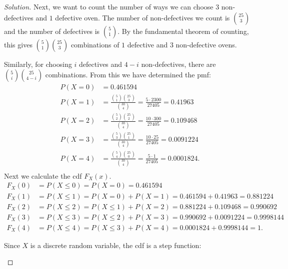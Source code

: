 \documentclass[12pt]{article}
\theoremstyle{definition}
\theoremstyle{plain}
\newenvironment{solution}
  {\begin{proof}[Solution]}
  {\end{proof}}
\begin{document}
\begin{enumerate}
\begin{solution}
Next, we want to count the number of ways we can choose $ 3 $ non-defectives and $ 1 $ defective oven. The number of non-defectives we count is $ \binom{25}{3} $ and the number of defectives is $ \binom{5}{1} $. By the fundamental theorem of counting, this gives $ \binom{5}{1}  \binom{25}{3}$ combinations of $ 1$ defective and $ 3 $ non-defective ovens.

Similarly, for choosing $ i $ defectives and $ 4 - i $ non-defectives, there are $ \binom{5}{i} \binom{25}{4 - i} $ combinations. From this we have determined the pmf:
\begin{align*}
	P(X = 0) &= 0.461594 \\
	P(X = 1) &= \frac{\binom{5}{1} \binom{25}{3}}{ \binom{30}{4}} = \frac{5 \cdot 2300}{27405} = 0.41963\\
	P(X = 2) &= \frac{\binom{5}{2} \binom{25}{2}}{ \binom{30}{4}} = \frac{10 \cdot 300}{27405} = 0.109468 \\
	P(X = 3) &= \frac{\binom{5}{3} \binom{25}{1}}{ \binom{30}{4}} = \frac{10 \cdot 25}{27405} = 0.0091224 \\
	P(X = 4) &= \frac{\binom{5}{4} \binom{25}{0}}{ \binom{30}{4}} = \frac{5 \cdot 1  }{27405} = 0.0001824 .\\
\end{align*}
Next we calculate the cdf $F_X(x) $.
\begin{align*}
	F_X(0) &= P(X \leq 0) = P(X = 0) = 0.461594\\
	F_X(1) &= P(X \leq 1) = P(X = 0) + P(X = 1) = 0.461594 + 0.41963 = 0.881224\\
	F_X(2) &= P(X \leq 2) = P(X \leq 1) + P(X = 2) = 0.881224 + 0.109468 = 0.990692\\
	F_X(3) &= P(X \leq 3) = P(X \leq 2) + P(X = 3) = 0.990692 + 0.0091224 = 0.9998144\\
	F_X(4) &= P(X \leq 4) = P(X \leq 3) + P(X = 4) = 0.0001824 + 0.9998144 = 1.
\end{align*}

Since $ X $ is a discrete random variable, the cdf is a step function:


\begin{center}
\end{center}
\end{solution}


\end{enumerate}
\end{document}
